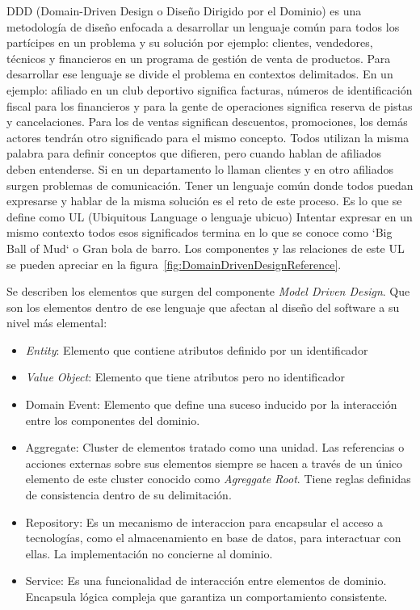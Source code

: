 \gls{DDD} (Domain-Driven Design o Diseño Dirigido por el Dominio) es una metodología de diseño enfocada a desarrollar un lenguaje común para todos los partícipes en un problema y su solución por ejemplo: clientes, vendedores, técnicos y financieros en un programa de gestión de venta de productos.
Para desarrollar ese lenguaje se divide el problema en contextos delimitados.
En un ejemplo: afiliado en un club deportivo significa facturas, números de identificación fiscal para los financieros y para la gente de operaciones significa reserva de pistas y cancelaciones.
Para los de ventas significan descuentos, promociones, los demás actores tendrán otro significado para el mismo concepto.
Todos utilizan la misma palabra para definir conceptos que difieren, pero cuando hablan de afiliados deben entenderse.
Si en un departamento lo llaman clientes y en otro afiliados surgen problemas de comunicación.
Tener un lenguaje común donde todos puedan expresarse y hablar de la misma solución es el reto de este proceso.
Es lo que se define como \gls{UL} (Ubiquitous Language o lenguaje ubicuo) Intentar expresar en un mismo contexto todos esos significados termina en lo que se conoce como `Big Ball of Mud` o Gran bola de barro.
Los componentes y las relaciones de este UL se pueden apreciar en la figura~\cref{fig:DomainDrivenDesignReference}.

Se describen los elementos que surgen del componente \textit{Model Driven Design}.
Que son los elementos dentro de ese lenguaje que afectan al diseño del software a su nivel más elemental:

\begin{itemize}
    \item \textit{Entity}: Elemento que contiene atributos definido por un identificador
    \item \textit{Value Object}: Elemento que tiene atributos pero no identificador
    \item Domain Event: Elemento que define una suceso inducido por la interacción entre los componentes del dominio.
    \item Aggregate: Cluster de elementos tratado como una unidad.
    Las referencias o acciones externas sobre sus elementos siempre se hacen a través de un único elemento de este cluster conocido como \textit{Agreggate Root}.
    Tiene reglas definidas de consistencia dentro de su delimitación.
    \item Repository: Es un mecanismo de interaccion para encapsular el acceso a tecnologías, como el almacenamiento en base de datos, para interactuar con ellas.
    La implementación no concierne al dominio.
    \item Service: Es una funcionalidad de interacción entre elementos de dominio.
    Encapsula lógica compleja que garantiza un comportamiento consistente.
\end{itemize}

